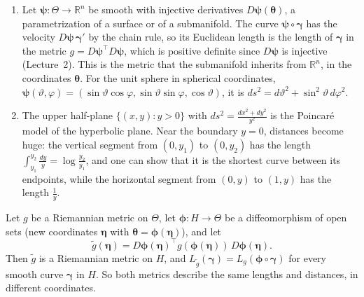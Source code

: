 \begin{example}\label{A-ex:induced-metric}
    \begin{enumerate}
        \item Let $\boldsymbol{\psi}: \Theta \to \mathbb{R}^n$ be smooth with injective derivatives $D\boldsymbol{\psi}(\boldsymbol{\theta})$, a parametrization of a surface or of a submanifold. The curve $\boldsymbol{\psi} \circ \boldsymbol{\gamma}$ has the velocity $D\boldsymbol{\psi}\,\boldsymbol{\gamma}'$ by the chain rule, so its Euclidean length is the length of $\boldsymbol{\gamma}$ in the metric $g = D\boldsymbol{\psi}^\top D\boldsymbol{\psi}$, which is positive definite since $D\boldsymbol{\psi}$ is injective (Lecture~2). This is the metric that the submanifold inherits from $\mathbb{R}^n$, in the coordinates $\boldsymbol{\theta}$. For the unit sphere in spherical coordinates, $\boldsymbol{\psi}(\vartheta, \varphi) = (\sin\vartheta\cos\varphi, \sin\vartheta\sin\varphi, \cos\vartheta)$, it is $ds^2 = d\vartheta^2 + \sin^2\vartheta\, d\varphi^2$.
        \item The upper half-plane $\{(x, y) : y > 0\}$ with $ds^2 = \frac{dx^2 + dy^2}{y^2}$ is the Poincar\'e model of the hyperbolic plane. Near the boundary $y = 0$, distances become huge: the vertical segment from $(0, y_1)$ to $(0, y_2)$ has the length $\int_{y_1}^{y_2}\frac{dy}{y} = \log\frac{y_2}{y_1}$, and one can show that it is the shortest curve between its endpoints, while the horizontal segment from $(0, y)$ to $(1, y)$ has the length $\frac{1}{y}$.
    \end{enumerate}
\end{example}

\begin{proposition}\label{A-prop:metric-coordinates}
    Let $g$ be a Riemannian metric on $\Theta$, let $\boldsymbol{\phi}: H \to \Theta$ be a diffeomorphism of open sets (new coordinates $\boldsymbol{\eta}$ with $\boldsymbol{\theta} = \boldsymbol{\phi}(\boldsymbol{\eta})$), and let
    \[\tilde g(\boldsymbol{\eta}) = D\boldsymbol{\phi}(\boldsymbol{\eta})^\top g(\boldsymbol{\phi}(\boldsymbol{\eta}))\,D\boldsymbol{\phi}(\boldsymbol{\eta}).\]
    Then $\tilde g$ is a Riemannian metric on $H$, and $L_{\tilde g}(\boldsymbol{\gamma}) = L_g(\boldsymbol{\phi} \circ \boldsymbol{\gamma})$ for every smooth curve $\boldsymbol{\gamma}$ in $H$. So both metrics describe the same lengths and distances, in different coordinates.
\end{proposition}

